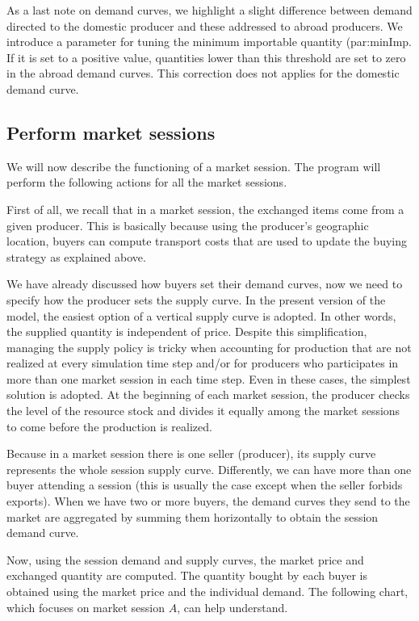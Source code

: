 \documentclass{article}
\begin{document}
As a last note on demand curves, we highlight a slight difference between demand directed to the domestic producer and these addressed to abroad producers. We introduce a parameter for tuning the minimum importable quantity (\gls{par:minImp}. If it is set to a positive value, quantities lower than this threshold are set to zero in the abroad demand curves. This correction does not applies for the domestic demand curve. 

\subsection{Perform market sessions}

We will now describe the functioning of a market session. The program will perform the following actions for all the market sessions.

First of all, we recall that in a market session, the exchanged items come from a given producer. This is basically because using the producer's geographic location, buyers can compute transport costs that are used to update the buying strategy as explained above.

We have already discussed how buyers set their demand curves, now we need to specify how the producer sets the supply curve. In the present version of the model, the easiest option of a vertical supply curve is adopted. In other words, the supplied quantity is independent of price. Despite this simplification, managing the supply policy is tricky when accounting for production that are not realized at every simulation time step and/or for producers who participates in more than one market session in each time step. 
Even in these cases, the simplest solution is adopted. At the beginning of each market session, the producer checks the level of the resource stock and divides it equally among the market sessions to come before the production is realized.   

Because in a market session there is one seller (producer), its supply curve represents the whole session supply curve. Differently, we can have more than one buyer attending a session (this is usually the case except when the seller forbids exports). When we have two or more buyers, the demand curves they send to the market are aggregated by summing them horizontally to obtain the session demand curve.

Now, using the session demand and supply curves, the market price and exchanged quantity are computed. The quantity bought by each buyer is obtained using the market price and the individual demand.
The following chart, which focuses on market session $A$, can help understand.
\end{document}
